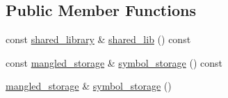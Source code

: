 \subsection*{Public Member Functions}
\begin{DoxyCompactItemize}
\item 
const \hyperlink{a00271}{shared\+\_\+library} \& \hyperlink{a00281_a250a3fd1bf0c5285f640c567e5128e7f}{shared\+\_\+lib} () const 
\item 
const \hyperlink{a00214}{mangled\+\_\+storage} \& \hyperlink{a00281_a31df130e5d9060dd16d3abb0f2a4f5db}{symbol\+\_\+storage} () const 
\item 
\hyperlink{a00214}{mangled\+\_\+storage} \& \hyperlink{a00281_acfa6c8fc1336c5e9c153f72125c13998}{symbol\+\_\+storage} ()\hypertarget{a00281_acfa6c8fc1336c5e9c153f72125c13998}{}\label{a00281_acfa6c8fc1336c5e9c153f72125c13998}


\end{DoxyCompactItemize}
